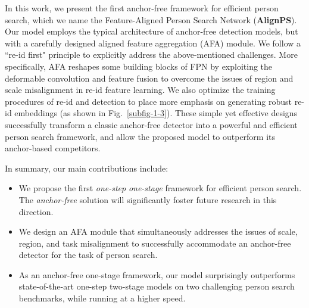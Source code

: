 \documentclass[final]{cvpr}
\begin{document}
In this work, we present the first anchor-free framework for efficient person search, which we name the Feature-Aligned Person Search Network (\textbf{AlignPS}). Our model employs the typical architecture of anchor-free detection models, but with a carefully designed aligned feature aggregation (AFA) module. We follow a ``re-id first" principle to explicitly address the above-mentioned challenges. More specifically, AFA reshapes some building blocks of FPN by exploiting the deformable convolution and feature fusion to overcome the issues of region and scale misalignment in re-id feature learning. We also optimize the training procedures of re-id and detection to place more emphasis on generating robust re-id embeddings (as shown in Fig.~\ref{subfig-1-3}). These simple yet effective designs successfully transform a classic anchor-free detector into a powerful and efficient person search framework, and allow the proposed model to outperform its anchor-based competitors.


In summary, our main contributions include:
\begin{itemize}
\setlength{\itemsep}{0pt}
	\setlength{\parsep}{-2pt}
	\setlength{\parskip}{-0pt}
	\setlength{\leftmargin}{-15pt}
	\vspace{-7pt}
    \item We propose the first \emph{one-step} \emph{one-stage} framework for efficient person search. The \emph{anchor-free} solution will significantly foster future research in this direction.
    \item We design an AFA module that simultaneously addresses the issues of scale, region, and task misalignment to successfully accommodate an anchor-free detector for the task of person search.
    \item As an anchor-free one-stage framework, our model surprisingly outperforms state-of-the-art one-step two-stage models on two challenging person search benchmarks, while running at a higher speed.
\end{itemize}
\end{document}
